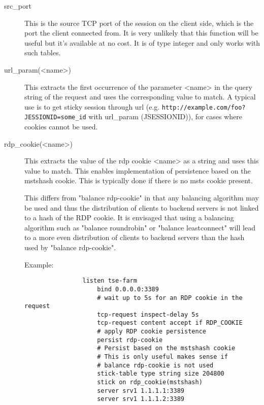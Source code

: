 \begin{description}
\item[src\_port] 
               This is the source TCP port of the session on the client side,
               which is the port the client connected from. It is very unlikely
               that this function will be useful but it's available at no cost.
               It is of type integer and only works with such tables.

\item[url\_param(<name>)]
               This extracts the first occurrence of the parameter <name> in
               the query string of the request and uses the corresponding value
               to match. A typical use is to get sticky session through url
               (e.g. \verb|http://example.com/foo?JESSIONID=some_id| with
               url\_param (JSESSIONID)), for cases where cookies cannot be used.

\item[rdp\_cookie(<name>)]
               This extracts the value of the rdp cookie <name> as a string
               and uses this value to match. This enables implementation of
               persistence based on the mstshash cookie. This is typically
               done if there is no msts cookie present.

               This differs from "balance rdp-cookie" in that any balancing
               algorithm may be used and thus the distribution of clients
               to backend servers is not linked to a hash of the RDP
               cookie. It is envisaged that using a balancing algorithm
               such as "balance roundrobin" or "balance leastconnect" will
               lead to a more even distribution of clients to backend
               servers than the hash used by "balance rdp-cookie".

               Example:
               \begin{verbatim}
                listen tse-farm
                    bind 0.0.0.0:3389
                    # wait up to 5s for an RDP cookie in the request
                    tcp-request inspect-delay 5s
                    tcp-request content accept if RDP_COOKIE
                    # apply RDP cookie persistence
                    persist rdp-cookie
                    # Persist based on the mstshash cookie
                    # This is only useful makes sense if
                    # balance rdp-cookie is not used
                    stick-table type string size 204800
                    stick on rdp_cookie(mstshash)
                    server srv1 1.1.1.1:3389
                    server srv1 1.1.1.2:3389
               \end{verbatim}



\end{description}
